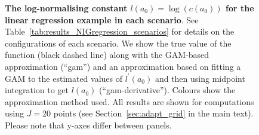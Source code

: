 \documentclass[a4paper, notitlepage, 11pt]{article}
\begin{document}
\begin{figure}[!ht]
\begin{center}
\hfill
{}
\hfill
\end{center}
\caption{\textbf{The log-normalising constant $l(a_0) = \log(c(a_0))$ for the linear regression example in each scenario}.
See Table~\ref{tab:results_NIGregression_scenarios} for details on the configurations of each scenario.
We show the true value of the function (black dashed line) along with the GAM-based approximation (``gam'') and an approximation based on fitting a GAM to the estimated values of $l^\prime(a_0)$ and then using midpoint integration to get $l(a_0)$ (``gam-derivative'').
Colours show the approximation method used.
All results are shown for computations using $J = 20$ points (see Section~\ref{sec:adapt_grid} in the main text).
Please note that y-axes differ between panels.
}
\label{sfig:ca0_NIGRegression}
\end{figure}
\end{document}

